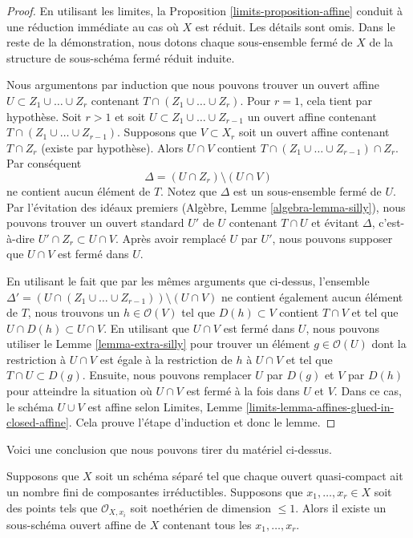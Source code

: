 \begin{proof}
En utilisant les limites, la Proposition
\ref{limits-proposition-affine} conduit à une réduction
immédiate au cas où $X$ est réduit. Les détails sont omis. Dans
le reste de la démonstration, nous dotons chaque sous-ensemble
fermé de $X$ de la structure de sous-schéma fermé réduit induite.

\medskip\noindent
Nous argumentons par induction que nous pouvons trouver un
ouvert affine $U \subset Z_1 \cup \ldots \cup Z_r$
contenant $T \cap (Z_1 \cup \ldots \cup Z_r)$. Pour $r =
1$, cela tient par hypothèse. Soit $r > 1$ et soit $U
\subset Z_1 \cup \ldots \cup Z_{r - 1}$ un ouvert affine
contenant $T \cap (Z_1 \cup \ldots \cup Z_{r - 1})$.
Supposons que $V \subset X_r$ soit un ouvert affine contenant $T
\cap Z_r$ (existe par hypothèse). Alors $U \cap V$ contient $T
\cap ( Z_1 \cup \ldots \cup Z_{r - 1} ) \cap Z_r$. Par conséquent
$$
\Delta = (U \cap Z_r) \setminus (U \cap V)
$$
ne contient aucun élément de $T$. Notez que $\Delta$ est un
sous-ensemble fermé de $U$. Par l'évitation des idéaux premiers
(Algèbre, Lemme \ref{algebra-lemma-silly}), nous pouvons trouver un
ouvert standard $U'$ de $U$ contenant $T \cap U$ et évitant $\Delta$,
c'est-à-dire $U' \cap Z_r \subset U \cap V$. Après avoir remplacé
$U$ par $U'$, nous pouvons supposer que $U \cap V$ est fermé dans $U$.

\medskip\noindent
En utilisant le fait que par les mêmes arguments que ci-dessus,
l'ensemble $\Delta' = (U \cap (Z_1 \cup \ldots \cup Z_{r - 1}))
\setminus (U \cap V)$ ne contient également aucun élément de $T$, nous
trouvons un $h \in \mathcal{O}(V)$ tel que $D(h) \subset V$ contient
$T \cap V$ et tel que $U \cap D(h) \subset U \cap V$. En utilisant que
$U \cap V$ est fermé dans $U$, nous pouvons utiliser le Lemme
\ref{lemma-extra-silly} pour trouver un élément $g \in \mathcal{O}(U)$
dont la restriction à $U \cap V$ est égale à la restriction de $h$ à $U
\cap V$ et tel que $T \cap U \subset D(g)$. Ensuite, nous pouvons
remplacer $U$ par $D(g)$ et $V$ par $D(h)$ pour atteindre la situation
où $U \cap V$ est fermé à la fois dans $U$ et $V$. Dans ce cas, le
schéma $U \cup V$ est affine selon Limites, Lemme
\ref{limits-lemma-affines-glued-in-closed-affine}. Cela prouve l'étape d'induction et donc le lemme.
\end{proof}

\noindent
Voici une conclusion que nous pouvons tirer du matériel ci-dessus.

\begin{proposition}
\label{proposition-finite-set-of-points-of-codim-1-in-affine}
Supposons que $X$ soit un schéma séparé tel que chaque ouvert
quasi-compact ait un nombre fini de composantes irréductibles.
Supposons que $x_1, \ldots, x_r \in X$ soit des points tels que
$\mathcal{O}_{X, x_i}$ soit noethérien de dimension $\leq 1$. Alors il
existe un sous-schéma ouvert affine de $X$ contenant tous les $x_1, \ldots, x_r$.
\end{proposition}

